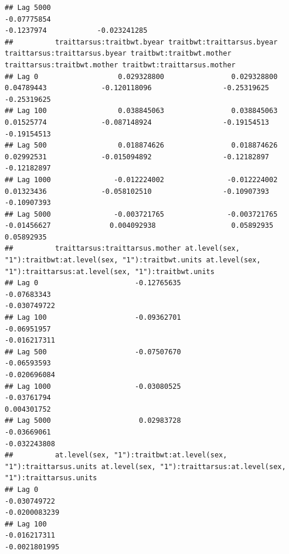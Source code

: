 \documentclass[
  12pt,
]{book}
\begin{document}
\begin{verbatim}
## Lag 5000                                                       -0.07775854                                                           -0.1237974            -0.023241285
##          traittarsus:traitbwt.byear traitbwt:traittarsus.byear traittarsus:traittarsus.byear traitbwt:traitbwt.mother traittarsus:traitbwt.mother traitbwt:traittarsus.mother
## Lag 0                   0.029328800                0.029328800                    0.04789443             -0.120118096                 -0.25319625                 -0.25319625
## Lag 100                 0.038845063                0.038845063                    0.01525774             -0.087148924                 -0.19154513                 -0.19154513
## Lag 500                 0.018874626                0.018874626                    0.02992531             -0.015094892                 -0.12182897                 -0.12182897
## Lag 1000               -0.012224002               -0.012224002                    0.01323436             -0.058102510                 -0.10907393                 -0.10907393
## Lag 5000               -0.003721765               -0.003721765                   -0.01456627              0.004092938                  0.05892935                  0.05892935
##          traittarsus:traittarsus.mother at.level(sex, "1"):traitbwt:at.level(sex, "1"):traitbwt.units at.level(sex, "1"):traittarsus:at.level(sex, "1"):traitbwt.units
## Lag 0                       -0.12765635                                                   -0.07683343                                                     -0.030749722
## Lag 100                     -0.09362701                                                   -0.06951957                                                     -0.016217311
## Lag 500                     -0.07507670                                                   -0.06593593                                                     -0.020696084
## Lag 1000                    -0.03080525                                                   -0.03761794                                                      0.004301752
## Lag 5000                     0.02983728                                                   -0.03669061                                                     -0.032243808
##          at.level(sex, "1"):traitbwt:at.level(sex, "1"):traittarsus.units at.level(sex, "1"):traittarsus:at.level(sex, "1"):traittarsus.units
## Lag 0                                                        -0.030749722                                                       -0.0200083239
## Lag 100                                                      -0.016217311                                                       -0.0021801995

\end{verbatim}
\end{document}
